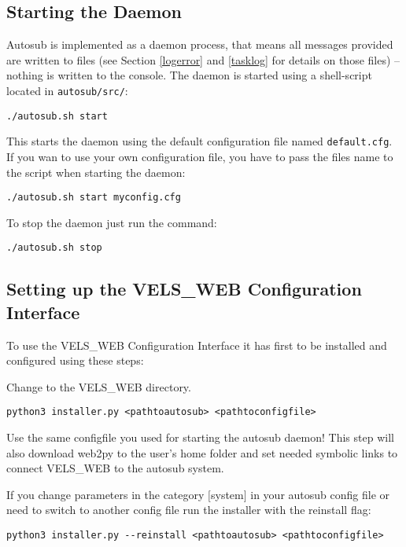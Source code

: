 \subsection{Starting the Daemon}

Autosub is implemented as a daemon process, that means all messages provided are written
to files (see Section \ref{logerror} and \ref{tasklog} for details on those files) --
nothing is written to the console. The daemon is started using a shell-script located
in {\tt autosub/src/}:

\begin{verbatim}
./autosub.sh start
\end{verbatim}

This starts the daemon using the default configuration file named {\tt default.cfg}. If you
wan to use your own configuration file, you have to pass the files name to the script when
starting the daemon:

\begin{verbatim}
./autosub.sh start myconfig.cfg
\end{verbatim}

To stop the daemon just run the command:

\begin{verbatim}
./autosub.sh stop
\end{verbatim}

\subsection{Setting up the VELS\_WEB Configuration Interface}
To use the VELS\_WEB Configuration Interface it has first to be installed and
configured using these steps:

Change to the VELS\_WEB directory.

\begin{verbatim}
python3 installer.py <pathtoautosub> <pathtoconfigfile>
\end{verbatim}

Use the same configfile you used for starting the autosub daemon! This step will
also download web2py to the user's home folder and set needed symbolic links to
connect VELS\_WEB to the autosub system.

If you change parameters in the category $[$system$]$ in your autosub config file or need to switch to
another config file run the installer with the reinstall flag:

\begin{verbatim}
python3 installer.py --reinstall <pathtoautosub> <pathtoconfigfile>
\end{verbatim}

